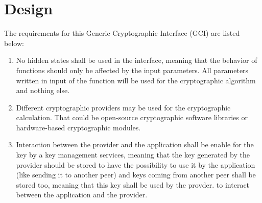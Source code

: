 \chapter{Design}

The requirements for this Generic Cryptographic Interface (GCI) are listed
below:
\begin{enumerate}
  \item No hidden states shall be used in the interface, meaning that the
  behavior of functions should only be affected by the input parameters.\newline
  All parameters written in input of the function will be used for the
  cryptographic algorithm and nothing else.
  \item Different cryptographic providers may be used for the cryptographic
  calculation. \newline
  That could be open-source cryptographic software libraries or hardware-based cryptographic modules.
  \item Interaction between the provider and the application shall be
  enable for the key by a  key management services, meaning that the key
  generated by the provider should be stored to have the possibility to use it
  by the application (like sending it to another peer) and keys coming from
  another peer shall be stored too, meaning that this key shall be used by the provder.
  \newline to interact between the application and
  the provider.
\end{enumerate}
